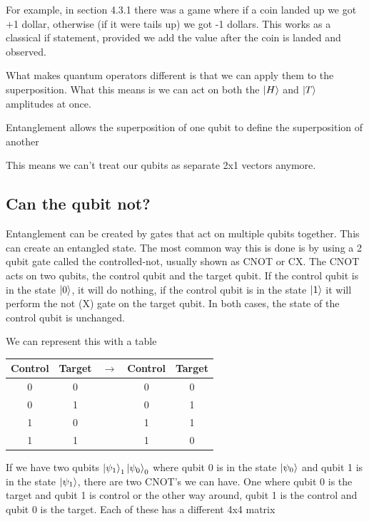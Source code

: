 \documentclass{book}
\begin{document}
 For example, in section 4.3.1 there was a game where if a coin landed up we got +1 dollar, otherwise (if it were tails up) we got -1 dollars. This works as a classical if statement, provided we add the value after the coin is landed and observed. 

What makes quantum operators different is that we can apply them to the superposition. What this means is we can act on both the $\ket{H}$ and $\ket{T}$ amplitudes at once. 



Entanglement allows the superposition of one qubit to define the superposition of another

This means we can't treat our qubits as separate 2x1 vectors anymore. 


\subsection{ Can the qubit not? }

Entanglement can be created by gates that act on multiple qubits together. This can create an entangled state. The most common way this is done is by using a 2 qubit gate called the controlled-not, usually shown as CNOT or CX. The CNOT acts on two qubits, the control qubit and the target qubit. If the control qubit is in the state $\ket{0}$, it will do nothing, if the control qubit is in the state $\ket{1}$ it will perform the not (X) gate on the target qubit. In both cases, the state of the control qubit is unchanged. 

We can represent this with a table

\begin{center}
\begin{tabular}{ | c | c | c | c | c |}
\hline
 Control & Target & $\rightarrow{}$ & Control & Target \\ 
  \hline\hline
 0 & 0 &  & 0 & 0 \\ 
 \hline
 0 & 1 &  & 0 & 1 \\
 \hline
 1 & 0 &  & 1 & 1 \\
 \hline
 1 & 1 &  & 1 & 0 \\
 \hline
  
\end{tabular}
\end{center}

If we have two qubits $\ket{\psi_1}_1\ket{\psi_0}_0$ where qubit 0 is in the state $\ket{\psi_0}$ and qubit 1 is in the state $\ket{\psi_1}$, there are two CNOT's we can have. One where qubit 0 is the target and qubit 1 is control or the other way around, qubit 1 is the control and qubit 0 is the target. Each of these has a different 4x4 matrix
\end{document}

